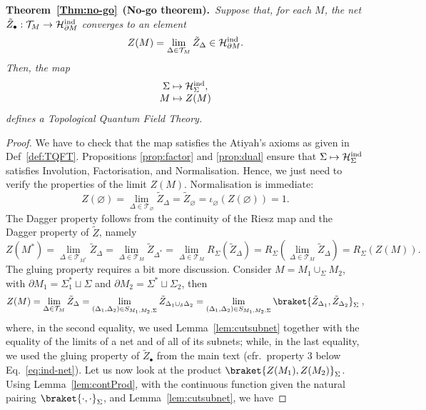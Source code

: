 \documentclass[11pt]{article}
\newcommand{\Hil}{\mathcal{H}}
\newcommand{\Hind}{\mathcal{H}_{\Sigma}^{\rm ind}}
\newcommand{\del}{\partial}
\theoremstyle{definition}
\numberwithin{equation}{section}
\begin{document}
\noindent
\textbf{Theorem~\ref{Thm:no-go}}~\textbf{(No-go theorem).}~\emph{Suppose that, for each $M$, the net $\tilde{Z}_\bullet: \mathcal{T}_M\to \Hil^{\rm ind}_{\del M}$ converges to an element
    \begin{equation}
        Z(M)=\lim_{\Delta\in\mathcal{T}_M}\tilde{Z}_{\Delta}\in\Hil^{\rm ind}_{\del M}.
    \end{equation}
    Then, the map 
    \begin{equation*}
        \begin{matrix}
            \Sigma\mapsto\Hind,\\
            M\mapsto Z(M)
        \end{matrix}
    \end{equation*}
    defines a Topological Quantum Field Theory.}
    \begin{proof}
        We have to check that the map satisfies the Atiyah's axioms as given in Def~\ref{def:TQFT}. Propositions \ref{prop:factor} and \ref{prop:dual} ensure that $\Sigma\mapsto\Hind$ satisfies Involution, Factorisation, and Normalisation. Hence, we just need to verify the properties of the limit $Z(M)$.
        Normalisation is immediate:
        \[Z(\varnothing)=\lim_{\Delta\in\mathcal{T}_{\varnothing}}\tilde{Z}_{\Delta}=\tilde{Z}_{\varnothing}=\iota_{\varnothing}(Z(\varnothing))=1.\]
        The Dagger property follows from the continuity of the Riesz map and the Dagger property of $\tilde{Z}$, namely
        \[Z(M^*)=\lim_{\Delta\in\mathcal{T}_{M^*}}\tilde{Z}_{\Delta}=\lim_{\Delta\in\mathcal{T}_{M}}\tilde{Z}_{\Delta^*}=\lim_{\Delta\in\mathcal{T}_{M}}R_{\Sigma}(\tilde{Z}_{\Delta})=R_{\Sigma}(\lim_{\Delta\in\mathcal{T}_{M}}\tilde{Z}_{\Delta})=R_{\Sigma}(Z(M)).\]
        The gluing property requires a bit more discussion. Consider $M=M_1\cup_{\Sigma}M_2$, with $\del M_1=\Sigma_1^*\sqcup\Sigma$ and $\del M_2=\Sigma^*\sqcup\Sigma_2$, then
        \begin{align*}
    Z(M)=\lim_{\Delta\in\mathcal{T}_M}\tilde{Z}_{\Delta}=\lim_{(\Delta_1,\Delta_2)\in S_{M_1,M_2,\Sigma}}\tilde{Z}_{\Delta_1\cup_{\delta}\Delta_2}=\lim_{(\Delta_1,\Delta_2)\in S_{M_1,M_2,\Sigma}}\braket{\tilde{Z}_{\Delta_1},\tilde{Z}_{\Delta_2}}_{\Sigma}\;,
\end{align*}
where, in the second equality, we used Lemma~\ref{lem:cutsubnet} together with the equality of the limits of a net and of all of its subnets; while, in the last equality, we used the gluing property of $\tilde Z_{\bullet}$ from the main text (cfr.~property 3 below Eq.~\eqref{eq:ind-net}).
    Let us now look at the product $\braket{Z(M_1),Z(M_2)}_{\Sigma}$. Using Lemma~\ref{lem:contProd}, with the continuous function given the natural pairing $\braket{\cdot,\cdot}_{\Sigma}$, and Lemma~\ref{lem:cutsubnet}, we have

\end{proof}
\end{document}
